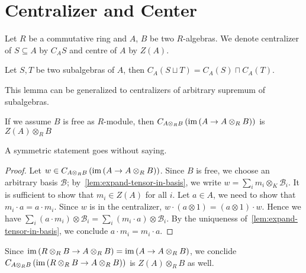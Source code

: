 \section{Centralizer and Center}
Let $R$ be a commutative ring and $A$, $B$ be two $R$-algebras. We denote centralizer of $S\subseteq A$ by $C_{A}S$ and centre of $A$ by $Z(A)$.

\begin{lemma}
  Let $S, T$ be two subalgebras of $A$, then $C_{A}(S\sqcup T)=C_{A}(S)\sqcap C_{A}(T)$.
  \leanok
\end{lemma}
This lemma can be generalized to centralizers of arbitrary supremum of subalgebras.

\begin{lemma}
  If we assume $B$ is free as $R$-module, then $C_{A\otimes_{R}B}\left(\operatorname{im}\left(A\to A\otimes_{R}B\right)\right)$ is $Z(A) \otimes_{R} B$
\end{lemma}
A symmetric statement goes without saying.
\begin{proof}
  Let $w\in C_{A\otimes_{R}B}\left(\operatorname{im}\left(A\to A\otimes_{R}B\right)\right)$. Since $B$ is free, we choose an arbitrary basis $\mathcal{B}$; by~\cref{lem:expand-tensor-in-basis}, we write $w = \sum_{i}m_{i}\otimes_{K}\mathcal{B}_{i}$. It is sufficient to show that $m_{i}\in Z(A)$ for all $i$. Let $a \in A$, we need to show that $m_{i}\cdot a = a \cdot m_{i}$. Since $w$ is in the centralizer, $w \cdot (a\otimes 1) = (a\otimes 1)\cdot w$. Hence we have $\sum_{i}(a\cdot m_{i})\otimes\mathcal{B}_{i}=\sum_{i}(m_{i}\cdot a)\otimes\mathcal{B}_{i}$. By the uniqueness of~\cref{lem:expand-tensor-in-basis}, we conclude $a\cdot m_{i}=m_{i}\cdot a$.
\end{proof}

\begin{remark}
  Since $\operatorname{im}\left(R\otimes_{R}B\to A\otimes_{R}B\right)=\operatorname{im}\left(A\to A\otimes_{R}B\right)$, we conclide $C_{A\otimes_{R}B}\left(\operatorname{im}\left(R\otimes_{R}B\to A\otimes_{R}B\right)\right)$ is $Z(A)\otimes_{R}B$ as well.
\end{remark}

